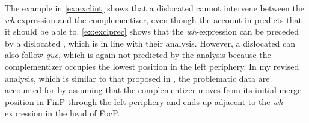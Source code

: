 \label{ex:exclprobs}
	\z
\z


The example in \eqref{ex:exclint} shows that a dislocated  cannot intervene between the \textit{wh}-expression and the complementizer, even though the account in \citet{DemonteSoriano2009} predicts that it should be able to. \eqref{ex:exclprec} shows that the \textit{wh}-expression can be preceded by a dislocated , which is in line with their analysis. However, a dislocated  can also follow \emph{que},  which is again not predicted by the analysis because the complementizer occupies the lowest position in the left periphery. In my revised analysis, which is similar to that proposed in  \citet{DemonteSoriano2009}, the problematic data are accounted for by assuming that the complementizer moves from its initial merge position in FinP through the left periphery and ends up adjacent to the \textit{wh}-expression in the head of FocP. 





